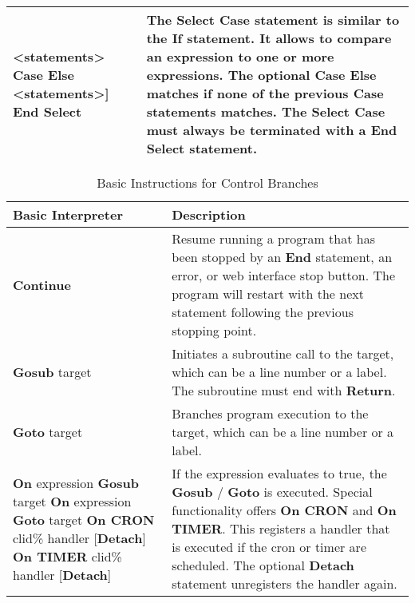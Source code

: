 \begin{table}[]
\begin{tabular}{|p{4cm}|p{10cm}|}
<statements>\newline
\textbf{Case Else}\newline
<statements>]\newline
\textbf{End Select}
& The \textbf{Select Case} statement is similar to the \textbf{If} statement. It allows to compare an expression to one or more expressions. The optional \textbf{Case Else} matches if none of the previous \textbf{Case} statements matches.\newline 
The \textbf{Select Case} must always be terminated with a \textbf{End Select} statement.
\\ \hline
\end{tabular}
\end{table}

\begin{table}[]
\centering
\caption{Basic Instructions for Control Branches}
\label{Basic_Instructions_for_Control_Branches}
\begin{tabular}{|p{4cm}|p{10cm}|}
\hline
\textbf{Basic Interpreter} & \textbf{Description}                                                     \\ \hline
\textbf{Continue} & Resume running a program that has been stopped by an \textbf{End} statement,
an error, or web interface stop button. The program will restart with the next statement
following the previous stopping point.
\\ \hline
\textbf{Gosub} target & Initiates a subroutine call to the target, which can be a line number or a
label. The subroutine must end with \textbf{Return}.
\\ \hline
\textbf{Goto} target & Branches program execution to the target, which can be a line number or
a label.
\\ \hline
\textbf{On} expression \textbf{Gosub} target\newline 
\textbf{On} expression \textbf{Goto} target\newline 
\textbf{On CRON} clid\% handler [\textbf{Detach}]\newline 
\textbf{On TIMER} clid\% handler [\textbf{Detach}]\newline 
& If the expression evaluates to true, the \textbf{Gosub} / \textbf{Goto} is executed.\newline
Special functionality offers \textbf{On CRON} and \textbf{On TIMER}. This registers a handler that is executed if the cron or timer are scheduled. \newline
The optional \textbf{Detach} statement unregisters the handler again.
\\ \hline
\end{tabular}
\end{table}

